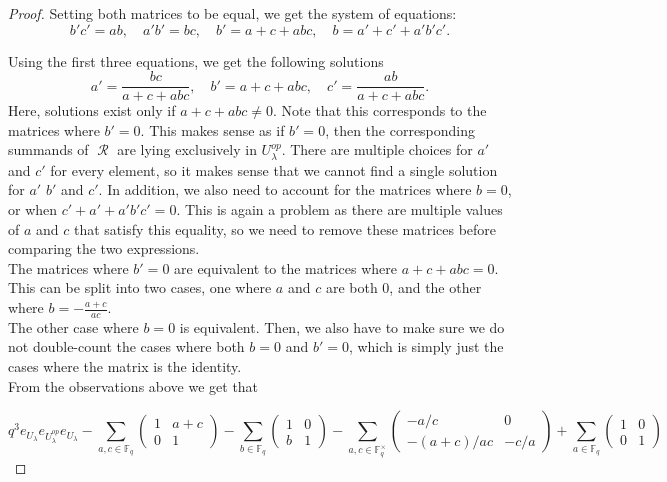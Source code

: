 \documentclass[12pt,reqno]{amsart}
\theoremstyle{definition}
\theoremstyle{remark}
\numberwithin{equation}{section}
\DeclareMathOperator{\R}{\mathcal{R}}
\begin{document}
\begin{proof}
Setting both matrices to be equal, we get the system of equations:
\[
    b'c' = ab, \quad a'b' = bc, \quad b' = a+c+abc, \quad b = a'+c'+a'b'c'.
\]

Using the first three equations, we get the following solutions
\[
    a' = \frac{bc}{a+c+abc}, \quad b' = a+c+abc, \quad c' = \frac{ab}{a+c+abc}.
\]
Here, solutions exist only if $a+c+abc \ne 0$. Note that this corresponds to the matrices where $b' = 0$. This makes sense as if $b' = 0$, then the corresponding summands of $\R$ are lying exclusively in $U^{op}_\lambda$. There are multiple choices for $a'$ and $c'$ for every element, so it makes sense that we cannot find a single solution for $a'$ $b'$ and $c'$. In addition, we also need to account for the matrices where $b=0$, or when $c'+a'+a'b'c' = 0$. This is again a problem as there are multiple values of $a$ and $c$ that satisfy this equality, so we need to remove these matrices before comparing the two expressions.\\

The matrices where $b' = 0$ are equivalent to the matrices where $a+c+abc = 0$. This can be split into two cases, one where $a$ and $c$ are both $0$, and the other where $b = -\frac{a+c}{ac}$.\\

The other case where $b = 0$ is equivalent. Then, we also have to make sure we do not double-count the cases where both $b = 0$ and $b' = 0$, which is simply just the cases where the matrix is the identity.\\

From the observations above we get that

\[q^3 e_{U_{\lambda}}e_{U_{\lambda}^{op}}e_{U_{\lambda}} - \sum_{a, c \in \mathbb{F}_q} 
\begin{pmatrix}
1 & a+c \\
0 & 1 
\end{pmatrix} - \sum_{b \in \mathbb{F}_q}
\begin{pmatrix}
1 & 0 \\
b & 1 
\end{pmatrix}
- \sum_{a, c \in \mathbb{F}_q^{\times}}
\begin{pmatrix}
-a/c & 0 \\
-(a+c)/ac & -c/a 
\end{pmatrix}
+\sum_{a \in \mathbb{F}_q}
\begin{pmatrix}
1 & 0 \\
0 & 1 
\end{pmatrix}\]


\end{proof}
\end{document}

